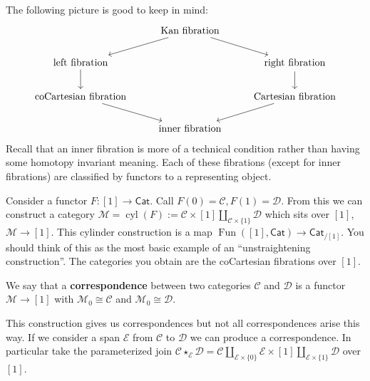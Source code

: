 \documentclass{amsart}
\DeclareMathOperator{\Fun}{Fun}
\DeclareMathOperator{\cyl}{cyl}
\begin{document}
The following picture is good to keep in mind:
\begin{equation*}
    \begin{tikzcd}
        & \text{Kan fibration}\ar[dl]\ar[dr] & \\
        \text{left fibration}\dar & & \text{right fibration}\dar \\
        \text{coCartesian fibration}\ar[dr] & & \text{Cartesian fibration}\ar[dl] \\
        & \text{inner fibration} &
    \end{tikzcd}
\end{equation*}
Recall that an inner fibration is more of a technical condition rather than
having some homotopy invariant meaning. Each of these fibrations (except for
inner fibrations) are classified by functors to a representing object.
\begin{example}
    Consider a functor $F:[1]\to \mathsf{Cat}$. Call $F(0)=\mathcal{C}, F(1)=\mathcal{D}$.
    From this we can construct a category $\mathcal{M}=\cyl(F) := \mathcal{C}\times[1]\coprod_{\mathcal{C}\times\{1\}}\mathcal{D}$
    which sits over $[1]$, $\mathcal{M}\to [1]$. This cylinder construction is
    a map $\Fun([1],\mathsf{Cat})\to \mathsf{Cat}_{/[1]}$. You should think of this as
    the most basic example of an ``unstraightening construction''. The categories you
    obtain are the coCartesian fibrations over $[1]$.
\end{example}
\begin{definition}
    We say that a \textbf{correspondence} between two categories $\mathcal{C}$ and $\mathcal{D}$
    is a functor $\mathcal{M}\to[1]$ with $\mathcal{M}_0\cong \mathcal{C}$ and $\mathcal{M}_0\cong \mathcal{D}$.
\end{definition}
This construction gives us correspondences but not all correspondences arise this way.
If we consider a span $\mathcal{E}$ from $\mathcal{C}$ to $\mathcal{D}$ we can produce a correspondence.
In particular take the parameterized join $\mathcal{C}\star_\mathcal{E}\mathcal{D}=\mathcal{C}\coprod_{\mathcal{E}\times\{0\}}\mathcal{E}\times[1]\coprod_{\mathcal{E}\times\{1\}}\mathcal{D}$ over $[1]$.
\end{document}
